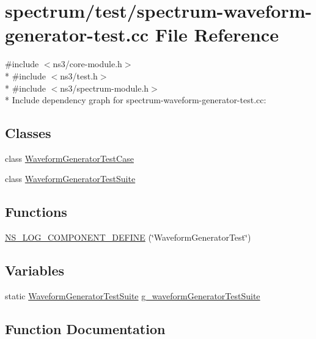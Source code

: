 \hypertarget{spectrum-waveform-generator-test_8cc}{}\section{spectrum/test/spectrum-\/waveform-\/generator-\/test.cc File Reference}
\label{spectrum-waveform-generator-test_8cc}
{\ttfamily \#include $<$ns3/core-\/module.\+h$>$}\\*
{\ttfamily \#include $<$ns3/test.\+h$>$}\\*
{\ttfamily \#include $<$ns3/spectrum-\/module.\+h$>$}\\*
Include dependency graph for spectrum-\/waveform-\/generator-\/test.cc\+:
\subsection*{Classes}
\begin{DoxyCompactItemize}
\item 
class \hyperlink{classWaveformGeneratorTestCase}{Waveform\+Generator\+Test\+Case}
\item 
class \hyperlink{classWaveformGeneratorTestSuite}{Waveform\+Generator\+Test\+Suite}
\end{DoxyCompactItemize}
\subsection*{Functions}
\begin{DoxyCompactItemize}
\item 
\hyperlink{spectrum-waveform-generator-test_8cc_a83ac767125176a7ab89cf10a58136c90}{N\+S\+\_\+\+L\+O\+G\+\_\+\+C\+O\+M\+P\+O\+N\+E\+N\+T\+\_\+\+D\+E\+F\+I\+NE} (\char`\"{}Waveform\+Generator\+Test\char`\"{})
\end{DoxyCompactItemize}
\subsection*{Variables}
\begin{DoxyCompactItemize}
\item 
static \hyperlink{classWaveformGeneratorTestSuite}{Waveform\+Generator\+Test\+Suite} \hyperlink{spectrum-waveform-generator-test_8cc_ac23e2418cb7cef0864a34ddf9b86347c}{g\+\_\+waveform\+Generator\+Test\+Suite}
\end{DoxyCompactItemize}


\subsection{Function Documentation}
